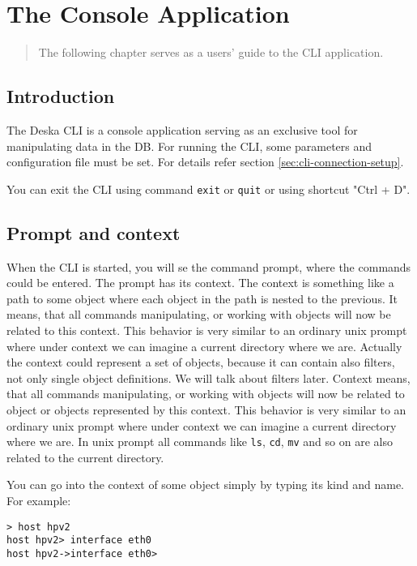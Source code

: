 \documentclass[deska]{subfiles}
\begin{document}
\chapter{The Console Application}
\label{sec:cli-usage}

\begin{abstract}
The following chapter serves as a users' guide to the CLI application.
\end{abstract}

\section{Introduction}

The Deska CLI is a console application serving as an exclusive tool for manipulating data in the DB. For running the
CLI, some parameters and configuration file must be set. For details refer section \ref{sec:cli-connection-setup}.

You can exit the CLI using command {\tt exit} or {\tt quit} or using shortcut "Ctrl + D".

\section{Prompt and context}

When the CLI is started, you will se the command prompt, where the commands could be entered. The prompt has its context.
The context is something like a path to some object where each object in the path is nested to the previous. 
It means, that all commands manipulating, or working with objects will now be related to this context. This behavior
is very similar to an ordinary unix prompt where under context we can imagine a current directory where we are. Actually the
context could represent a set of objects, because it can contain also filters, not only single object definitions.
We will talk about filters later. Context means, that all commands manipulating, or working with objects will now be related to
object or objects represented by this context. This behavior is very similar to an ordinary unix prompt where under context
we can imagine a current directory where we are. In unix prompt all commands like {\tt ls}, {\tt cd}, {\tt mv} and so on
are also related to the current directory.

You can go into the context of some object simply by typing its kind and name. For example:

\begin{verbatim}
> host hpv2
host hpv2> interface eth0
host hpv2->interface eth0>
\end{verbatim}
\end{document}
